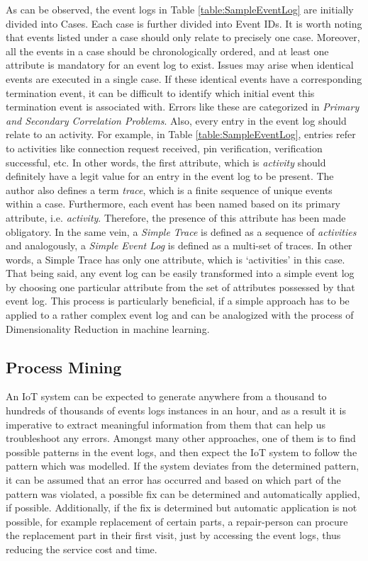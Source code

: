 As can be observed, the event logs in Table \ref{table:SampleEventLog} are initially divided into Cases. Each case is further divided into Event IDs. It is worth noting that events listed under a case should only relate to precisely one case. Moreover, all the events in a case should be chronologically ordered, and at least one attribute is mandatory for an event log to exist. Issues may arise when identical events are executed in a single case. If these identical events have a corresponding termination event, it can be difficult to identify which initial event this termination event is associated with. Errors like these are categorized in \textit{Primary and Secondary Correlation Problems}\cite{VanderAalst2011d}. Also, every entry in the event log should relate to an activity. For example, in Table \ref{table:SampleEventLog}, entries refer to activities like connection request received, pin verification, verification successful, etc. In other words, the first attribute, which is \textit{activity} should definitely have a legit value for an entry in the event log to be present. The author also defines a term \textit{trace}, which is a finite sequence of unique events within a case. Furthermore, each event has been named based on its primary attribute, i.e. \textit{activity}. Therefore, the presence of this attribute has been made obligatory. In the same vein, a \textit{Simple Trace} is defined as a sequence of \textit{activities} and analogously, a \textit{Simple Event Log} is defined as a multi-set of traces. In other words, a Simple Trace has only one attribute, which is ‘activities’ in this case. That being said, any event log can be easily transformed into a simple event log by choosing one particular attribute from the set of attributes possessed by that event log. This process is particularly beneficial, if a simple approach has to be applied to a rather complex event log and can be analogized with the process of Dimensionality Reduction in machine learning.

\subsection{Process Mining}

An IoT system can be expected to generate anywhere from a thousand to hundreds of thousands of events logs instances in an hour, and as a result it is imperative to extract meaningful information from them that can help us troubleshoot any errors. Amongst many other approaches, one of them is to find possible patterns in the event logs, and then expect the IoT system to follow the pattern which was modelled. If the system deviates from the determined pattern, it can be assumed that an error has occurred and based on which part of the pattern was violated, a possible fix can be determined and automatically applied, if possible. Additionally, if the fix is determined but automatic application is not possible, for example replacement of certain parts, a repair-person can procure the replacement part in their first visit, just by accessing the event logs, thus reducing the service cost and time. 

